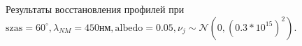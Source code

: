 \documentclass[a4paper,14pt]{article}
\theoremstyle{plain}
\theoremstyle{definition}
\theoremstyle{remark}
\begin{document}
\begin{figure}[bh]
\noindent{}
\caption{Результаты восстановления профилей при
$\text{szas}=60^{\circ}, \lambda_{NM}= 450\text{нм},
\text{albedo}=0.05, \nu_j \sim 
\mathcal{N}(0, (0.3 * 10^{15})^2)$.}
\label{prof3_12}
\end{figure}
\clearpage
\end{document}
